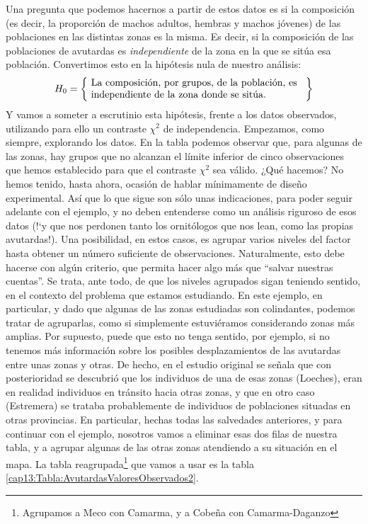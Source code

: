 \begin{Ejemplo}
Una pregunta que podemos hacernos a partir de estos datos es si la composición (es decir, la proporción de machos adultos, hembras y machos jóvenes) de las poblaciones en las distintas zonas es la misma. Es decir, si la composición de las poblaciones de avutardas es {\em independiente} de la zona en la que se sitúa esa población. Convertimos esto en la hipótesis nula de nuestro análisis:
    \[H_0=\left\{\mbox{
    \begin{minipage}{7.5cm} La composición, por grupos, de la población, es\\ independiente de la zona donde se sitúa.
    \end{minipage}
    }\right\}\]
Y vamos a someter a escrutinio esta hipótesis, frente a los datos observados, utilizando para ello un contraste $\chi^2$ de independencia. Empezamos, como siempre, explorando los datos. En la tabla podemos observar que, para algunas de las zonas, hay grupos que no alcanzan el límite inferior de cinco observaciones que hemos establecido para que el contraste $\chi^2$ sea válido. ¿Qué hacemos? No hemos tenido, hasta ahora, ocasión de hablar mínimamente de diseño experimental. Así que lo que sigue son sólo unas indicaciones, para poder seguir adelante con el ejemplo, y no deben entenderse como un análisis riguroso de esos datos ({!`}y que nos perdonen tanto los ornitólogos que nos lean, como las propias avutardas!). Una posibilidad, en estos casos, es agrupar varios niveles del factor hasta obtener un número suficiente de observaciones. Naturalmente, esto debe hacerse con algún criterio, que permita hacer algo más que ``salvar nuestras cuentas''. Se trata, ante todo, de que los niveles agrupados sigan teniendo sentido, en el contexto del problema que estamos estudiando. En este ejemplo, en particular, y dado que algunas de las zonas estudiadas son colindantes, podemos tratar de agruparlas, como si simplemente estuviéramos considerando zonas más amplias. Por supuesto, puede que esto no tenga sentido, por ejemplo, si no tenemos más información sobre los posibles desplazamientos de las avutardas entre unas zonas y otras. De hecho, en el estudio original se señala que con posterioridad se descubrió que los individuos de una de esas zonas (Loeches), eran en realidad individuos en tránsito hacia otras zonas, y que en otro caso (Estremera) se trataba probablemente de individuos de poblaciones situadas en otras provincias. En particular, hechas todas las salvedades anteriores, y para continuar con el ejemplo, nosotros vamos a eliminar esas dos filas de nuestra tabla, y a agrupar algunas de las otras zonas atendiendo a su situación en el mapa. La tabla reagrupada\footnote{Agrupamos a Meco con Camarma, y a Cobeña con Camarma-Daganzo} que vamos a usar es la tabla \ref{cap13:Tabla:AvutardasValoresObservados2}.


\end{Ejemplo}
